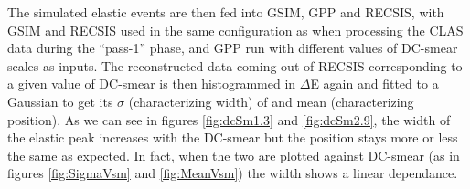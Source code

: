 The simulated elastic events are then fed into GSIM, GPP and RECSIS, with GSIM and RECSIS used in the same configuration as when processing the CLAS data 
during the ``pass-1'' phase, and GPP run with different values of DC-smear scales as inputs. The reconstructed data coming out of RECSIS corresponding to 
a given value of DC-smear is then histogrammed in $\Delta$E again and fitted to a Gaussian to get its $\sigma$ (characterizing width) of and mean 
(characterizing position). As we can see in figures \ref{fig:dcSm1.3} and \ref{fig:dcSm2.9}, %
the width of the elastic peak increases with the DC-smear but the position stays more or less the same as expected. In fact, when the two are plotted 
against DC-smear (as in figures \ref{fig:SigmaVsm} and \ref{fig:MeanVsm}) %
the width shows a linear dependance.



  %


